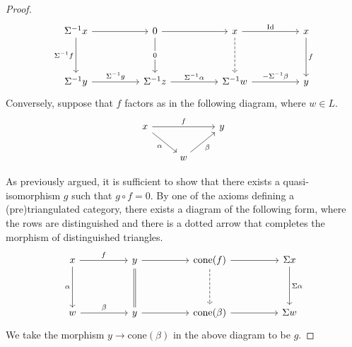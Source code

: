 \documentclass[oneside,11pt]{amsart}
\theoremstyle{definition}
\theoremstyle{remark}
\begin{document}
\begin{proof}
\[\begin{tikzcd}
	{\Sigma^{-1}x} && 0 && x && x \\
	\\
	{\Sigma^{-1}y} && {\Sigma^{-1}z} && {\Sigma^{-1}w} && y
	\arrow[from=1-1, to=1-3]
	\arrow["{\Sigma^{-1}f}"', from=1-1, to=3-1]
	\arrow[from=1-3, to=1-5]
	\arrow["0"{description}, from=1-3, to=3-3]
	\arrow["{\text{Id}}", from=1-5, to=1-7]
	\arrow[dashed, from=1-5, to=3-5]
	\arrow["f", from=1-7, to=3-7]
	\arrow["{\Sigma^{-1}g}", from=3-1, to=3-3]
	\arrow["{\Sigma^{-1}\alpha}", from=3-3, to=3-5]
	\arrow["{-\Sigma^{-1}\beta}", from=3-5, to=3-7]
\end{tikzcd}\]
Conversely, suppose that $f$ factors as in the following diagram, where $w\in L$.
\[\begin{tikzcd}
	x && y \\
	& w
	\arrow["f", from=1-1, to=1-3]
	\arrow["\alpha"', from=1-1, to=2-2]
	\arrow["\beta"', from=2-2, to=1-3]
\end{tikzcd}\]

As previously argued, it is sufficient to show that there exists a quasi-isomorphism $g$ such that $g\circ f=0$. By one of the axioms defining a (pre)triangulated category, there exists a diagram of the following form, where the rows are distinguished and there is a dotted arrow that completes the morphism of distinguished triangles.
\[\begin{tikzcd}
	x && y && {\text{cone}(f)} && {\Sigma x} \\
	\\
	w && y && {\text{cone}(\beta)} && {\Sigma w}
	\arrow["f", from=1-1, to=1-3]
	\arrow["\alpha"', from=1-1, to=3-1]
	\arrow[from=1-3, to=1-5]
	\arrow[equals, from=1-3, to=3-3]
	\arrow[from=1-5, to=1-7]
	\arrow[dashed, from=1-5, to=3-5]
	\arrow["\Sigma \alpha",from=1-7, to=3-7]
	\arrow["\beta ",from=3-1, to=3-3]
	\arrow[from=3-3, to=3-5]
	\arrow[from=3-5, to=3-7]
\end{tikzcd}\]
We take the morphism $y \rightarrow \text{cone}(\beta )$ in the above diagram to be $g$.  
\end{proof}
\end{document}
